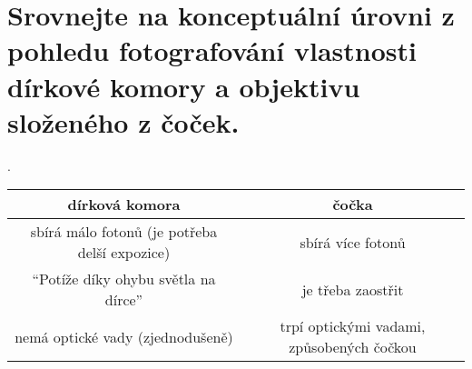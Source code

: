\section{Srovnejte na konceptuální úrovni z pohledu fotografování vlastnosti dírkové komory a objektivu složeného z 
čoček.}.
\begin{table}[H]
  \center
  \begin{tabular}{|c|c|}
    \hline
    dírková komora & čočka \\\hline
    \hline
    sbírá málo fotonů (je potřeba delší expozice) & sbírá více fotonů \\\hline
    \enquote{Potíže díky ohybu světla na dírce}\footnotemark & je třeba zaostřit \\\hline
    nemá optické vady (zjednodušeně)\footnotemark & trpí optickými vadami, způsobených čočkou \\\hline
  \end{tabular}
\end{table}
\addtocounter{footnote}{-1}
\addtocounter{footnote}{1}
